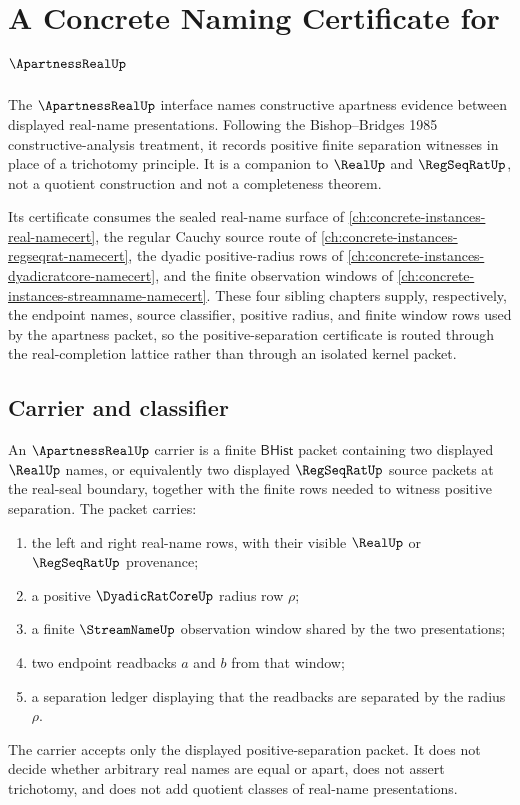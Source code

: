 \chapter{A Concrete Naming Certificate for $\ApartnessRealUp$}
\label{ch:concrete-instances-apartnessreal-namecert}

The $\ApartnessRealUp$ interface names constructive apartness evidence between displayed real-name presentations. Following the Bishop--Bridges 1985 constructive-analysis treatment, it records positive finite separation witnesses in place of a trichotomy principle. It is a companion to $\RealUp$ and $\RegSeqRatUp$, not a quotient construction and not a completeness theorem.

Its certificate consumes the sealed real-name surface of \autoref{ch:concrete-instances-real-namecert}, the regular Cauchy source route of \autoref{ch:concrete-instances-regseqrat-namecert}, the dyadic positive-radius rows of \autoref{ch:concrete-instances-dyadicratcore-namecert}, and the finite observation windows of \autoref{ch:concrete-instances-streamname-namecert}. These four sibling chapters supply, respectively, the endpoint names, source classifier, positive radius, and finite window rows used by the apartness packet, so the positive-separation certificate is routed through the real-completion lattice rather than through an isolated kernel packet.

\section{Carrier and classifier}
\label{sec:apartnessreal-carrier-classifier}

\begin{definition}
\label{def:apartnessreal-carrier}
An $\ApartnessRealUp$ carrier is a finite $\mathsf{BHist}$ packet containing two displayed $\RealUp$ names, or equivalently two displayed $\RegSeqRatUp$ source packets at the real-seal boundary, together with the finite rows needed to witness positive separation. The packet carries:
\begin{enumerate}
\item the left and right real-name rows, with their visible $\RealUp$ or $\RegSeqRatUp$ provenance;
\item a positive $\DyadicRatCoreUp$ radius row $\rho$;
\item a finite $\StreamNameUp$ observation window shared by the two presentations;
\item two endpoint readbacks $a$ and $b$ from that window;
\item a separation ledger displaying that the readbacks are separated by the radius $\rho$.
\end{enumerate}
The carrier accepts only the displayed positive-separation packet. It does not decide whether arbitrary real names are equal or apart, does not assert trichotomy, and does not add quotient classes of real-name presentations.
\end{definition}

